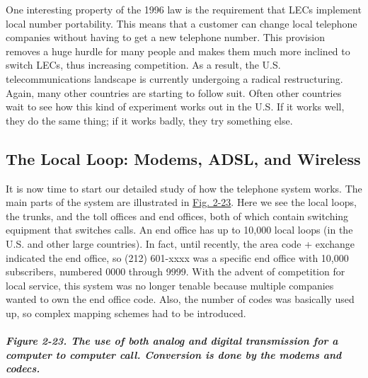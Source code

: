One interesting property of the 1996 law is the requirement that LECs
implement local number portability. This means that a customer can
change local telephone companies without having to get a new telephone
number. This provision removes a huge hurdle for many people and makes
them much more inclined to switch LECs, thus increasing competition. As
a result, the U.S. telecommunications landscape is currently undergoing
a radical restructuring. Again, many other countries are starting to
follow suit. Often other countries wait to see how this kind of
experiment works out in the U.S. If it works well, they do the same
thing; if it works badly, they try something else.

\protect\hypertarget{0130661023_ch02lev1sec5.htmlux5cux23ch02lev2sec19}{}{}

\subsection{The Local Loop: Modems, ADSL, and Wireless}

It is now time to start our detailed study of how the telephone system
works. The main parts of the system are illustrated in
\protect\hyperlink{0130661023_ch02lev1sec5.htmlux5cux23ch02fig23}{Fig.
2-23}. Here we see the local loops, the trunks, and the toll offices and
end offices, both of which contain switching equipment that switches
calls. An end office has up to 10,000 local loops (in the U.S. and other
large countries). In fact, until recently, the area code + exchange
indicated the end office, so (212) 601-xxxx was a specific end office
with 10,000 subscribers, numbered 0000 through 9999. With the advent of
competition for local service, this system was no longer tenable because
multiple companies wanted to own the end office code. Also, the number
of codes was basically used up, so complex mapping schemes had to be
introduced.

\subparagraph[Figure 2-23. The use of both analog and digital
transmission for a computer to computer call. Conversion is done by the
modems and
codecs.]{\texorpdfstring{\protect\hypertarget{0130661023_ch02lev1sec5.htmlux5cux23ch02fig23}{}{}Figure
2-23. The use of both analog and digital transmission for a computer to
computer call. Conversion is done by the modems and
codecs.}{Figure 2-23. The use of both analog and digital transmission for a computer to computer call. Conversion is done by the modems and codecs.}}


